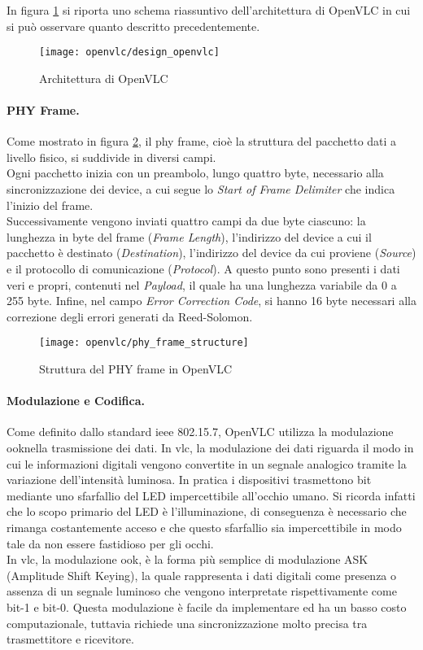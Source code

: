 In figura \ref{fig:design_openvlc} si riporta uno schema riassuntivo dell'architettura di OpenVLC in cui si può osservare quanto descritto precedentemente.
\begin{figure}[H] 
    \centering 
    \texttt{[image: openvlc/design\_openvlc]}
    \caption{Architettura di OpenVLC}
    \label{fig:design_openvlc}
\end{figure}

\paragraph{PHY Frame.}

Come mostrato in figura \ref{fig:phy_frame_structure}, il \gls{phy} frame, cioè la struttura del pacchetto dati a livello fisico, si suddivide in diversi campi.\\
Ogni pacchetto inizia con un preambolo, lungo quattro byte, necessario alla sincronizzazione dei device, a cui segue lo \textit{Start of Frame Delimiter} che indica l'inizio del frame.\\
Successivamente vengono inviati quattro campi da due byte ciascuno: la lunghezza in byte del frame (\textit{Frame Length}), l'indirizzo del device a cui il pacchetto è destinato (\textit{Destination}), l'indirizzo del device da cui proviene (\textit{Source}) e il protocollo di comunicazione (\textit{Protocol}).
A questo punto sono presenti i dati veri e propri, contenuti nel \textit{Payload}, il quale ha una lunghezza variabile da 0 a 255 byte.
Infine, nel campo \textit{Error Correction Code}, si hanno 16 byte necessari alla correzione degli errori generati da Reed-Solomon.
\begin{figure}[H] 
    \centering 
    \texttt{[image: openvlc/phy\_frame\_structure]}
    \caption{Struttura del PHY frame in OpenVLC}
    \label{fig:phy_frame_structure}
\end{figure}

\paragraph{Modulazione e Codifica.}
\noindent Come definito dallo standard \gls{ieee} 802.15.7, OpenVLC utilizza la modulazione \gls{ook}\glsfirstoccur nella trasmissione dei dati. In \gls{vlc}, la modulazione dei dati riguarda il modo in cui le informazioni digitali vengono convertite in un segnale analogico tramite la variazione dell'intensità luminosa. In pratica i dispositivi trasmettono bit mediante uno sfarfallio del LED impercettibile all'occhio umano. Si ricorda infatti che lo scopo primario del LED è l'illuminazione, di conseguenza è necessario che rimanga costantemente acceso e che questo sfarfallio sia impercettibile in modo tale da non essere fastidioso per gli occhi.\\
In \gls{vlc}, la modulazione \gls{ook}, è la forma più semplice di modulazione ASK (Amplitude Shift Keying), la quale rappresenta i dati digitali come presenza o assenza di un segnale luminoso che vengono interpretate rispettivamente come bit-1 e bit-0. Questa modulazione è facile da implementare ed ha un basso costo computazionale, tuttavia richiede una sincronizzazione molto precisa tra trasmettitore e ricevitore.

